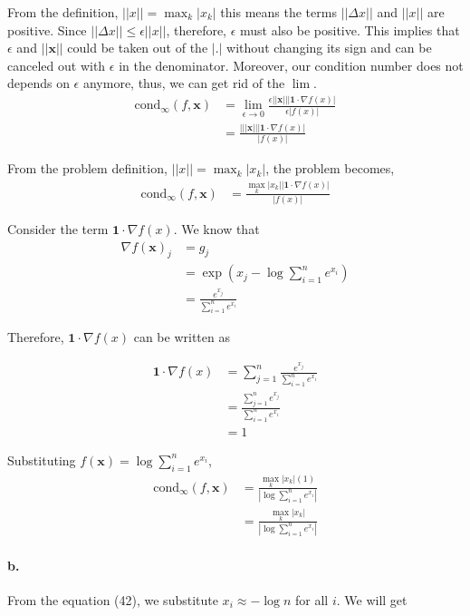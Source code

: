 \documentclass{scrartcl}
\begin{document}
From the definition, $||x|| = \max_k|x_k|$ this means the terms $||\Delta x||$ and $||x||$ are positive. 
Since $||\Delta x|| \leq \epsilon ||x||$, therefore, $\epsilon$ must also be positive. 
This implies that $\epsilon$ and $||\mathbf{x}||$ could be taken out of the $|.|$ without changing its sign and can be canceled out with $\epsilon $ in the denominator. Moreover, our condition number does not depends on $\epsilon$ anymore, thus, we can get rid of the $\lim$. 
\begin{align}
\textrm{cond}_\infty (f,\mathbf{x}) 
&=\lim\limits_{\epsilon \rightarrow 0} \frac{\epsilon||\mathbf{x}|| |\mathbf{1} \cdot \nabla f(x)|}{ \epsilon|f(x)|}\\
&=\frac{|||\mathbf{x}|| |\mathbf{1}\cdot \nabla f(x)|}{|f(x)|}
\end{align}

From the problem definition, $||x|| = \max_k|x_k|$, the problem becomes, 
\begin{align}
\textrm{cond}_\infty (f,\mathbf{x}) 
&=\frac{ \max_k|x_k| |\mathbf{1}\cdot \nabla f(x)|}{|f(x)|}
\end{align}

Consider the term $\mathbf{1}\cdot \nabla f(x)$.
We know that 
\begin{align}
\nabla f(\mathbf{x})_j 
&= g_j\\
&=\exp(x_j - \log{ \sum_{i=1}^{n} e^{x_i}} )\\
&= \frac{e^{x_j}}{\sum_{i=1}^{n} e^{x_i}}
\end{align}

Therefore, $\mathbf{1}\cdot \nabla f(x)$ can be written as

\begin{align}
\mathbf{1}\cdot \nabla f(x)
&= \sum_{j=1}^{n}{\frac{e^{x_j}}{\sum_{i=1}^{n} e^{x_i}}}\\
&= \frac{\sum_{j=1}^{n}{e^{x_j}}}{\sum_{i=1}^{n} e^{x_i}}\\
&= 1
\end{align}

Substituting $f(\mathbf{x}) = \log \sum_{i=1}^{n} e^{x_i}$,
\begin{align}
\textrm{cond}_\infty (f,\mathbf{x}) 
&=\frac{ \max_k|x_k| (1)}{|\log \sum_{i=1}^{n} e^{x_i}|}\\
&=\frac{ \max_k|x_k| }{|\log \sum_{i=1}^{n} e^{x_i}|}
\end{align}

\paragraph{b.}
From the equation (42), we substitute $x_i \approx - \log n$ for all $i$. We will get
\end{document}
